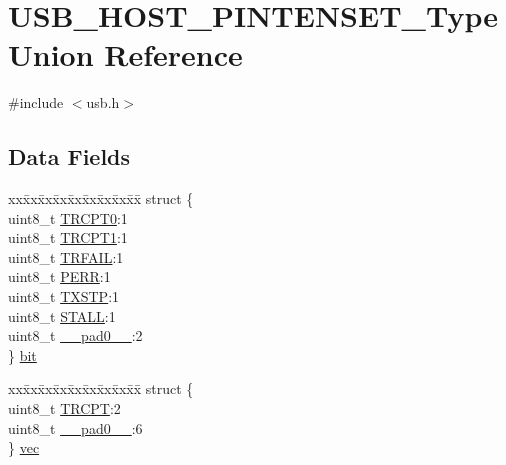 \hypertarget{union_u_s_b___h_o_s_t___p_i_n_t_e_n_s_e_t___type}{}\section{U\+S\+B\+\_\+\+H\+O\+S\+T\+\_\+\+P\+I\+N\+T\+E\+N\+S\+E\+T\+\_\+\+Type Union Reference}
\label{union_u_s_b___h_o_s_t___p_i_n_t_e_n_s_e_t___type}


{\ttfamily \#include $<$usb.\+h$>$}

\subsection*{Data Fields}
\begin{DoxyCompactItemize}
\item 
\begin{tabbing}
xx\=xx\=xx\=xx\=xx\=xx\=xx\=xx\=xx\=\kill
struct \{\\
\>uint8\_t \mbox{\hyperlink{union_u_s_b___h_o_s_t___p_i_n_t_e_n_s_e_t___type_a7180d96a777e3568fd150aa959df6838}{TRCPT0}}:1\\
\>uint8\_t \mbox{\hyperlink{union_u_s_b___h_o_s_t___p_i_n_t_e_n_s_e_t___type_abfd778fdb9c052b995d0dabc9e75081b}{TRCPT1}}:1\\
\>uint8\_t \mbox{\hyperlink{union_u_s_b___h_o_s_t___p_i_n_t_e_n_s_e_t___type_a07aec3336bfd9ba5afd1e3ee3272fc96}{TRFAIL}}:1\\
\>uint8\_t \mbox{\hyperlink{union_u_s_b___h_o_s_t___p_i_n_t_e_n_s_e_t___type_abb41b7932a36f56f81f4531b37cbd1d1}{PERR}}:1\\
\>uint8\_t \mbox{\hyperlink{union_u_s_b___h_o_s_t___p_i_n_t_e_n_s_e_t___type_a12a45aab272091d34c3e30cf8aa046fe}{TXSTP}}:1\\
\>uint8\_t \mbox{\hyperlink{union_u_s_b___h_o_s_t___p_i_n_t_e_n_s_e_t___type_a3115e3c453036179abec9286cab08407}{STALL}}:1\\
\>uint8\_t \mbox{\hyperlink{union_u_s_b___h_o_s_t___p_i_n_t_e_n_s_e_t___type_a8b4eebe79ded0459acec2f4950102ba3}{\_\_pad0\_\_}}:2\\
\} \mbox{\hyperlink{union_u_s_b___h_o_s_t___p_i_n_t_e_n_s_e_t___type_acd4e8f4681bf21957d3ce172508d99af}{bit}}\\

\end{tabbing}\item 
\begin{tabbing}
xx\=xx\=xx\=xx\=xx\=xx\=xx\=xx\=xx\=\kill
struct \{\\
\>uint8\_t \mbox{\hyperlink{union_u_s_b___h_o_s_t___p_i_n_t_e_n_s_e_t___type_a483e1559fa2eff15864d13c2f6fd29ae}{TRCPT}}:2\\
\>uint8\_t \mbox{\hyperlink{union_u_s_b___h_o_s_t___p_i_n_t_e_n_s_e_t___type_a8b4eebe79ded0459acec2f4950102ba3}{\_\_pad0\_\_}}:6\\
\} \mbox{\hyperlink{union_u_s_b___h_o_s_t___p_i_n_t_e_n_s_e_t___type_a9e946bf6470d5048eb9c09f8d30a2892}{vec}}\\


\end{tabbing}
\end{DoxyCompactItemize}
